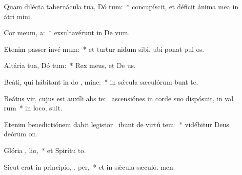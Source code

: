 \item Quam dilécta tabernácula tua, Dó tum:~* concupíscit, et déficit ánima mea in átri mini.
\item Cor meum,   a:~* exsultavérunt in De vum.
\item Etenim passer invé  mum:~* et turtur nidum sibi, ubi ponat pul os.
\item Altária tua, Dó tum:~* Rex meus, et De us.
\item Beáti, qui hábitant in do , mine:~* in sǽcula sæculórum bunt te.
\item Beátus vir, cujus est auxíli abs te:~\pscross{} ascensiónes in corde suo dispósuit, in val rum~* in loco,  suit.
\item Etenim benedictiónem dabit legistor~\pscross{} ibunt de virtú  tem:~* vidébitur Deus deórum  on.
\item Glória ,  lio,~* et Spirítu to.
\item Sicut erat in princípio,  ,  per,~* et in sǽcula sæculó. men.
